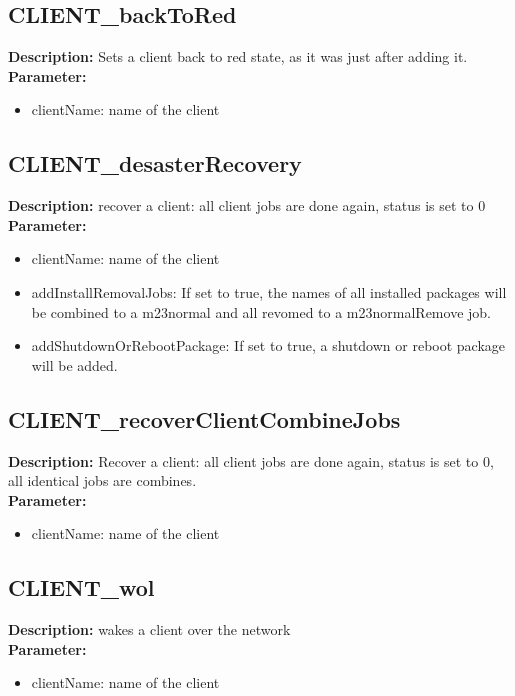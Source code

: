\subsection{CLIENT\_backToRed}
\textbf{Description:} Sets a client back to red state, as it was just after adding it.\\
\textbf{Parameter:}
\begin{itemize}
\item clientName: name of the client
\end{itemize}

\subsection{CLIENT\_desasterRecovery}
\textbf{Description:} recover a client: all client jobs are done again, status is set to 0\\
\textbf{Parameter:}
\begin{itemize}
\item clientName: name of the client
\item addInstallRemovalJobs: If set to true, the names of all installed packages will be combined to a m23normal and all revomed to a m23normalRemove job.
\item addShutdownOrRebootPackage: If set to true, a shutdown or reboot package will be added.
\end{itemize}

\subsection{CLIENT\_recoverClientCombineJobs}
\textbf{Description:} Recover a client: all client jobs are done again, status is set to 0, all identical jobs are combines.\\
\textbf{Parameter:}
\begin{itemize}
\item clientName: name of the client
\end{itemize}

\subsection{CLIENT\_wol}
\textbf{Description:} wakes a client over the network\\
\textbf{Parameter:}
\begin{itemize}
\item clientName: name of the client
\end{itemize}

